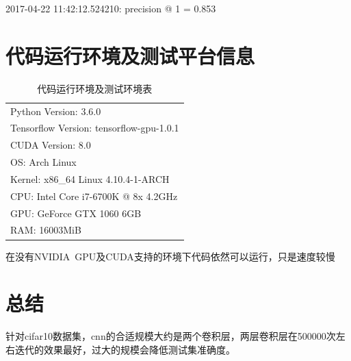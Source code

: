 \documentclass[a4paper, UTF8]{ctexrep}
\begin{document}
            2017-04-22 11:42:12.524210: precision @ 1 = 0.853
    	\section{代码运行环境及测试平台信息}
      \begin{table}[htbp!]
        \centering
        \begin{tabular}{l}
          \hline
          Python Version: 3.6.0 \\
          Tensorflow Version: tensorflow-gpu-1.0.1 \\
          CUDA Version: 8.0 \\
          OS: Arch Linux \\
          Kernel: x86\_64 Linux 4.10.4-1-ARCH \\
          CPU: Intel Core i7-6700K @ 8x 4.2GHz \\
          GPU: GeForce GTX 1060 6GB \\
          RAM: 16003MiB \\
          \hline
        \end{tabular}
        \caption{代码运行环境及测试环境表}
      \end{table}
      在没有NVIDIA\ GPU及CUDA支持的环境下代码依然可以运行，只是速度较慢
    \section{总结}
      针对cifar10数据集，cnn的合适规模大约是两个卷积层，两层卷积层在500000次左右迭代的效果最好，过大的规模会降低测试集准确度。
\end{document}
